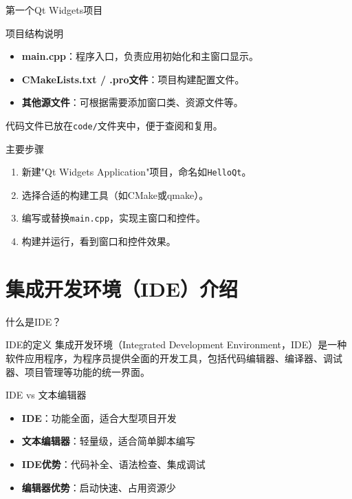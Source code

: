 \documentclass[UTF8,aspectratio=169]{beamer}
\begin{document}
\begin{frame}{第一个Qt Widgets项目}
    \begin{ytublock}{项目结构说明}
        \begin{itemize}
            \item \textbf{main.cpp}：程序入口，负责应用初始化和主窗口显示。
            \item \textbf{CMakeLists.txt / .pro文件}：项目构建配置文件。
            \item \textbf{其他源文件}：可根据需要添加窗口类、资源文件等。
        \end{itemize}
        代码文件已放在\texttt{code/}文件夹中，便于查阅和复用。
    \end{ytublock}
    \begin{ytublock}{主要步骤}
        \begin{enumerate}
            \item 新建"Qt Widgets Application"项目，命名如\texttt{HelloQt}。
            \item 选择合适的构建工具（如CMake或qmake）。
            \item 编写或替换\texttt{main.cpp}，实现主窗口和控件。
            \item 构建并运行，看到窗口和控件效果。
        \end{enumerate}
    \end{ytublock}
\end{frame}

\section{集成开发环境（IDE）介绍}

\begin{frame}{什么是IDE？}
    \begin{ytublock}{IDE的定义}
        集成开发环境（Integrated Development Environment，IDE）是一种软件应用程序，为程序员提供全面的开发工具，包括代码编辑器、编译器、调试器、项目管理等功能的统一界面。
    \end{ytublock}

    \begin{ytublock}{IDE vs 文本编辑器}
        \begin{itemize}
            \item \textbf{IDE}：功能全面，适合大型项目开发
            \item \textbf{文本编辑器}：轻量级，适合简单脚本编写
            \item \textbf{IDE优势}：代码补全、语法检查、集成调试
            \item \textbf{编辑器优势}：启动快速、占用资源少
        \end{itemize}
    \end{ytublock}
\end{frame}
\end{document}
